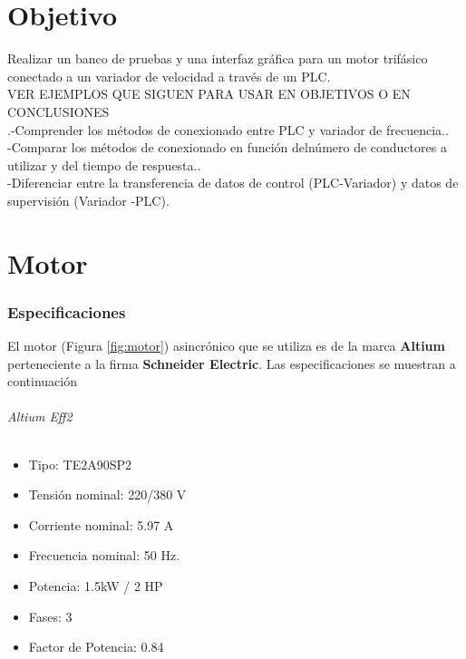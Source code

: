 \documentclass[12pt,a4paper]{article}
\begin{document}
	\part{Objetivo}
	Realizar un banco de pruebas y una interfaz gráfica para un motor trifásico conectado a un variador de velocidad a través de un PLC.\\
	VER EJEMPLOS QUE SIGUEN PARA USAR EN OBJETIVOS O EN CONCLUSIONES\\
	.-Comprender los   métodos de   conexionado   entre   PLC   y   variador   de frecuencia..\\-Comparar   los   métodos   de   conexionado   en   función   delnúmero   de conductores a utilizar y del tiempo de respuesta..\\-Diferenciar entre la transferencia de datos de control (PLC-Variador) y datos de supervisión (Variador -PLC).

	\newpage
	\part{Motor}
	\section{Especificaciones}
	El motor (Figura \ref{fig:motor}) asincrónico que se utiliza es de la marca \textbf{Altium} perteneciente a la firma \textbf{Schneider Electric}. Las especificaciones se muestran a continuación
	\paragraph*{Altium Eff2}
	\begin{itemize}
		\item 	Tipo: TE2A90SP2
		\item   Tensión nominal: 220/380 V
		\item 	Corriente nominal: 5.97 A 
		\item	Frecuencia nominal:  50 Hz.
		\item 	Potencia: 1.5kW / 2 HP
		\item 	Fases: 3
		\item   Factor de Potencia: 0.84
	\end{itemize}
	
\end{document}
